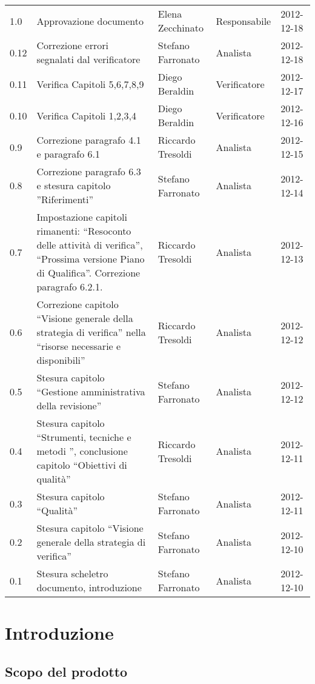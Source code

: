 \begin{longtable}{lp{}lll}
1.0 & Approvazione documento & Elena Zecchinato & Responsabile & 2012-12-18\\
0.12 & Correzione errori segnalati dal verificatore & Stefano Farronato & Analista & 2012-12-18\\
0.11 & Verifica Capitoli 5,6,7,8,9 & Diego Beraldin &Verificatore & 2012-12-17\\
0.10 & Verifica Capitoli 1,2,3,4 & Diego Beraldin &Verificatore & 2012-12-16\\
0.9 & Correzione paragrafo 4.1 e paragrafo 6.1 & Riccardo Tresoldi &Analista & 2012-12-15\\
0.8 & Correzione paragrafo 6.3 e stesura capitolo ''Riferimenti''& Stefano Farronato &Analista & 2012-12-14\\
0.7 & Impostazione capitoli rimanenti: ``Resoconto delle attività di verifica'', ``Prossima versione Piano di Qualifica''. Correzione paragrafo 6.2.1. & Riccardo Tresoldi &Analista & 2012-12-13\\
0.6 & Correzione capitolo ``Visione generale della strategia di verifica'' nella ``risorse necessarie e disponibili'' & Riccardo Tresoldi &Analista & 2012-12-12\\
0.5 & Stesura capitolo ``Gestione amministrativa della revisione''& Stefano Farronato & Analista& 2012-12-12\\
0.4 & Stesura capitolo ``Strumenti, tecniche e metodi '', conclusione capitolo ``Obiettivi di qualità'' & Riccardo Tresoldi & Analista & 2012-12-11\\
0.3 & Stesura capitolo ``Qualità'' & Stefano Farronato &Analista & 2012-12-11\\
0.2 & Stesura capitolo ``Visione generale della strategia di verifica'' & Stefano Farronato &Analista & 2012-12-10\\
0.1 & Stesura scheletro documento, introduzione & Stefano Farronato & Analista & 2012-12-10\\
\bottomrule
\end{longtable}
\newpage



\setcounter{page}{1}
\pagestyle{normal}

\section{Introduzione}
\subsection{Scopo del prodotto}
\purpose

